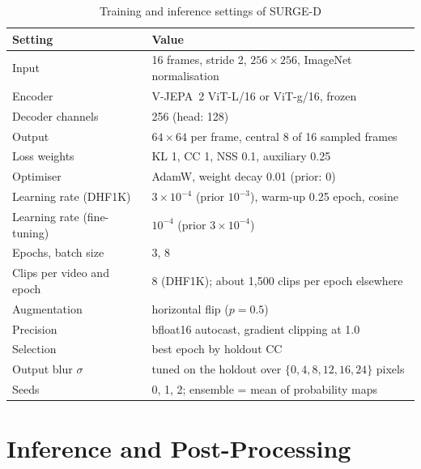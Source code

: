 \begin{table}[htbp]
  \centering
  \caption{Training and inference settings of SURGE-D}\label{tab:hyper}
  \small
  \begin{tabular}{@{}ll@{}}
    \toprule
    \textbf{Setting} & \textbf{Value} \\
    \midrule
    Input & 16 frames, stride 2, $256\times256$, ImageNet normalisation \\
    Encoder & \acrshort{V-JEPA}~2 \acrshort{ViT}-L/16 or \acrshort{ViT}-g/16, frozen \\
    Decoder channels & 256 (head: 128) \\
    Output & $64\times64$ per frame, central 8 of 16 sampled frames \\
    Loss weights & \acrshort{KL} 1, \acrshort{CC} 1, \acrshort{NSS} 0.1, auxiliary 0.25 \\
    Optimiser & AdamW, weight decay 0.01 (prior: 0) \\
    Learning rate (DHF1K) & $3\times10^{-4}$ (prior $10^{-3}$), warm-up 0.25 epoch, cosine \\
    Learning rate (fine-tuning) & $10^{-4}$ (prior $3\times10^{-4}$) \\
    Epochs, batch size & 3, 8 \\
    Clips per video and epoch & 8 (DHF1K); about 1,500 clips per epoch elsewhere \\
    Augmentation & horizontal flip ($p=0.5$) \\
    Precision & bfloat16 autocast, gradient clipping at 1.0 \\
    Selection & best epoch by holdout \acrshort{CC} \\
    Output blur $\sigma$ & tuned on the holdout over $\{0,4,8,12,16,24\}$ pixels \\
    Seeds & 0, 1, 2; ensemble = mean of probability maps \\
    \bottomrule
  \end{tabular}
\end{table}

\section{Inference and Post-Processing}\label{sec:inference}

